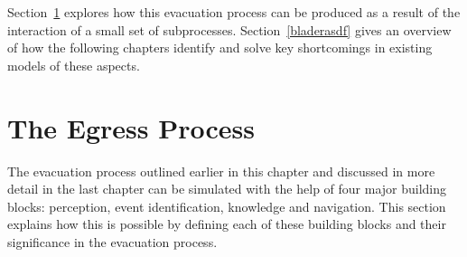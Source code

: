 

Section~\ref{IBEVAC:EgressProgress} explores how this evacuation process can be produced as a result of the interaction of a small set of subprocesses. Section~\ref{bladerasdf} gives an overview of how the following chapters identify and solve key shortcomings in existing models of these aspects.








\section{The Egress Process}
\label{IBEVAC:EgressProgress}

The evacuation process outlined earlier in this chapter and discussed in more detail in the last chapter can be simulated with the help of four major building blocks: perception, event identification, knowledge and navigation. This section explains how this is possible by defining each of these building blocks and their significance in the evacuation process.

